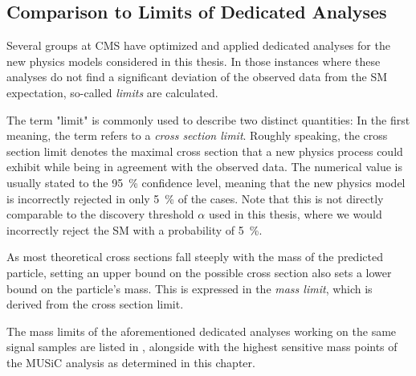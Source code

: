 \subsection{Comparison to Limits of Dedicated Analyses}
Several groups at \ac{CMS} have optimized and applied dedicated analyses for the new physics models considered in this thesis. In those instances where these analyses do not find a significant deviation of the observed data from the \ac{SM} expectation, so-called \emph{limits} are calculated.

The term "limit" is commonly used to describe two distinct quantities: In the first meaning, the term refers to a \emph{cross section limit}. Roughly speaking, the cross section limit denotes the maximal cross section that a new physics process could exhibit while being in agreement with the observed data. The numerical value is usually stated to the \SI{95}{\percent} confidence level, meaning that the new physics model is incorrectly rejected in only \SI{5}{\percent} of the cases. Note that this is not directly comparable to the discovery threshold $\alpha$ used in this thesis, where we would incorrectly reject the \acl{SM} with a probability of \SI{5}{\percent}.

As most theoretical cross sections fall steeply with the mass of the predicted particle, setting an upper bound on the possible cross section also sets a lower bound on the particle's mass. This is expressed in the \emph{mass limit}, which is derived from the cross section limit.

The mass limits of the aforementioned dedicated analyses working on the same signal samples are listed in , alongside with the highest sensitive mass points of the \ac{MUSiC} analysis as determined in this chapter. 

